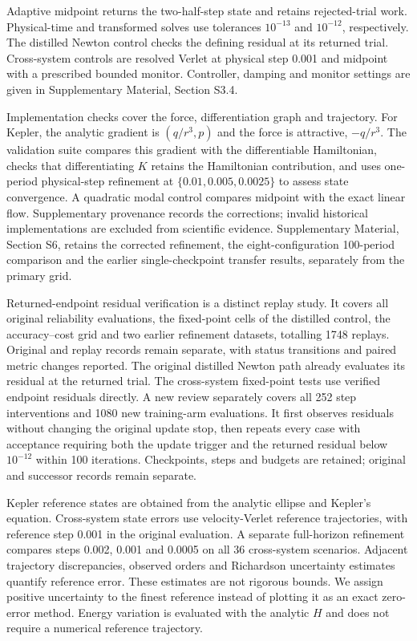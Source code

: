 \documentclass[final,3p,times]{elsarticle}
\begin{document}
Adaptive midpoint returns the two-half-step state and retains rejected-trial
work. Physical-time and transformed solves use tolerances $10^{-13}$
and $10^{-12}$, respectively. The distilled Newton control checks the
defining residual at its returned trial. Cross-system controls are
resolved Verlet at physical step 0.001 and midpoint with a prescribed
bounded monitor. Controller, damping and monitor settings are given in
Supplementary Material, Section S3.4.

Implementation checks cover the force, differentiation graph and trajectory.
For Kepler,
the analytic gradient is $(q/r^3,p)$ and the force is attractive,
$-q/r^3$. The validation suite compares this gradient with the
differentiable Hamiltonian, checks that differentiating $K$ retains
the Hamiltonian contribution, and uses one-period physical-step refinement
at $\{0.01,0.005,0.0025\}$ to assess state convergence. A quadratic modal
control compares midpoint with the exact linear flow. Supplementary
provenance records the corrections; invalid historical implementations
are excluded from scientific evidence.
Supplementary Material, Section S6, retains the corrected refinement,
the eight-configuration 100-period comparison and the earlier
single-checkpoint transfer results, separately from the primary grid.

Returned-endpoint residual verification is a distinct replay study. It
covers all original reliability evaluations, the fixed-point cells of the
distilled control, the accuracy--cost grid and two earlier refinement
datasets, totalling 1748 replays. Original and replay records remain
separate, with status transitions and paired metric changes reported.
The original distilled Newton path already evaluates its residual at the
returned trial. The cross-system fixed-point tests use verified endpoint
residuals directly. A new review separately covers all 252 step interventions
and 1080 new training-arm evaluations. It first observes residuals without
changing the original update stop, then repeats every case with acceptance
requiring both the update trigger and the returned residual below
$10^{-12}$ within 100 iterations. Checkpoints, steps and budgets are
retained; original and successor records remain separate.

Kepler reference states are obtained from the analytic ellipse and
Kepler's equation. Cross-system state errors use velocity-Verlet reference
trajectories, with reference step 0.001 in the original evaluation.
A separate full-horizon refinement compares steps 0.002, 0.001 and 0.0005
on all 36 cross-system scenarios. Adjacent trajectory discrepancies,
observed orders and Richardson uncertainty estimates quantify reference
error. These estimates are not rigorous bounds. We assign positive
uncertainty to the finest reference instead of plotting it as an exact
zero-error method. Energy variation is evaluated with the analytic
$H$ and does not require a numerical reference trajectory.
\end{document}
